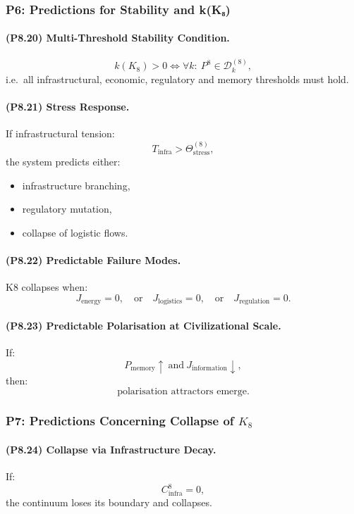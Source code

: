 \subsubsection{P6: Predictions for Stability and k(K₈)}

\paragraph{(P8.20) Multi-Threshold Stability Condition.}
\[
k(K_8) > 0 
\iff 
\forall k: \ P^8 \in \mathcal{D}_k^{(8)},
\]
i.e.\ all infrastructural, economic, regulatory and memory thresholds must hold.

\paragraph{(P8.21) Stress Response.}
If infrastructural tension:
\[
T_{\mathrm{infra}} > \Theta_{\mathrm{stress}}^{(8)},
\]
the system predicts either:
\begin{itemize}
    \item infrastructure branching,
    \item regulatory mutation,
    \item collapse of logistic flows.
\end{itemize}

\paragraph{(P8.22) Predictable Failure Modes.}
K8 collapses when:
\[
J_{\mathrm{energy}} = 0,
\quad \text{or} \quad
J_{\mathrm{logistics}} = 0,
\quad \text{or} \quad
J_{\mathrm{regulation}} = 0.
\]

\paragraph{(P8.23) Predictable Polarisation at Civilizational Scale.}
If:
\[
P_{\mathrm{memory}} \uparrow \ \text{and} \ 
J_{\mathrm{information}} \downarrow,
\]
then:
\[
\text{polarisation attractors emerge}.
\]

\subsubsection{P7: Predictions Concerning Collapse of \texorpdfstring{$K_8$}{K_8}}

\paragraph{(P8.24) Collapse via Infrastructure Decay.}
If:
\[
C_{\mathrm{infra}}^8 = 0,
\]
the continuum loses its boundary and collapses.

